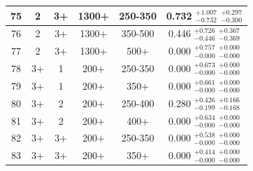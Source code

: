 \begin{table}[htbp]
\begin{centering}
\begin{tabular}{|c|c|c|c|c||c|}
\hline
75 &               2 &              3+ &           1300+ &         250-350 & 0.732 $^{+1.007}_{-0.732}$ $^{+0.297}_{-0.300}$ \\ 
\hline
76 &               2 &              3+ &           1300+ &         350-500 & 0.446 $^{+0.726}_{-0.446}$ $^{+0.367}_{-0.369}$ \\ 
\hline
77 &               2 &              3+ &           1300+ &            500+ & 0.000 $^{+0.757}_{-0.000}$ $^{+0.000}_{-0.000}$ \\ 
\hline
78 &              3+ &               1 &            200+ &         250-350 & 0.000 $^{+0.673}_{-0.000}$ $^{+0.000}_{-0.000}$ \\ 
\hline
79 &              3+ &               1 &            200+ &            350+ & 0.000 $^{+0.661}_{-0.000}$ $^{+0.000}_{-0.000}$ \\ 
\hline
80 &              3+ &               2 &            200+ &         250-400 & 0.280 $^{+0.426}_{-0.199}$ $^{+0.166}_{-0.168}$ \\ 
\hline
81 &              3+ &               2 &            200+ &            400+ & 0.000 $^{+0.634}_{-0.000}$ $^{+0.000}_{-0.000}$ \\ 
\hline
82 &              3+ &              3+ &            200+ &         250-350 & 0.000 $^{+0.538}_{-0.000}$ $^{+0.000}_{-0.000}$ \\ 
\hline
83 &              3+ &              3+ &            200+ &            350+ & 0.000 $^{+0.414}_{-0.000}$ $^{+0.000}_{-0.000}$ \\ 
\hline
\end{tabular}
\par\end{centering}
\end{table}

